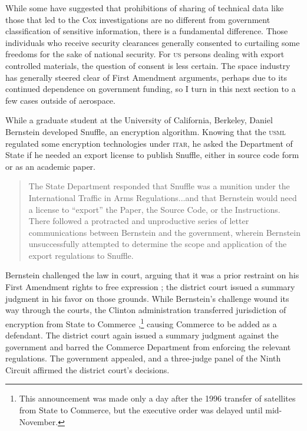 \documentclass[preprint,twocolumn,5p]{elsarticle}
\begin{document}
While some have suggested that prohibitions of sharing of technical data like those that led to the Cox investigations are no different from government classification of sensitive information, there is a fundamental difference. Those individuals who receive security clearances generally consented to curtailing some freedoms for the sake of national security. For \textsc{us} persons dealing with export controlled materials, the question of consent is less certain. The space industry has generally steered clear of First Amendment arguments, perhaps due to its continued dependence on government funding, so I turn in this next section to a few cases outside of aerospace.

While a graduate student at the University of California, Berkeley, Daniel Bernstein developed Snuffle, an encryption algorithm. Knowing that the \textsc{usml} regulated some encryption technologies under \textsc{itar}, he asked the Department of State if he needed an export license to publish Snuffle, either in source code form or as an academic paper.
\begin{quote}
The State Department responded that Snuffle was a munition under the International Traffic in Arms Regulations...and that Bernstein would need a license to ``export'' the Paper, the Source Code, or the Instructions. There followed a protracted and unproductive series of letter communications between Bernstein and the government, wherein Bernstein unsuccessfully attempted to determine the scope and application of the export regulations to Snuffle. \citep{Bernstein1997}
\end{quote}
%
Bernstein challenged the law in court, arguing that it was a prior restraint on his First Amendment rights to free expression \citep{Bernstein1997}; the district court issued a summary judgment in his favor on those grounds. While Bernstein's challenge wound its way through the courts, the Clinton administration transferred jurisdiction of encryption from State to Commerce \citep{ExecOrder13026_1996},\footnote{This announcement was made only a day after the 1996 transfer of satellites from State to Commerce, but the executive order was delayed until mid-November.} causing Commerce to be added as a defendant. The district court again issued a summary judgment against the government and barred the Commerce Department from enforcing the relevant regulations. The government appealed, and a three-judge panel of the Ninth Circuit affirmed the district court's decisions.
\end{document}
